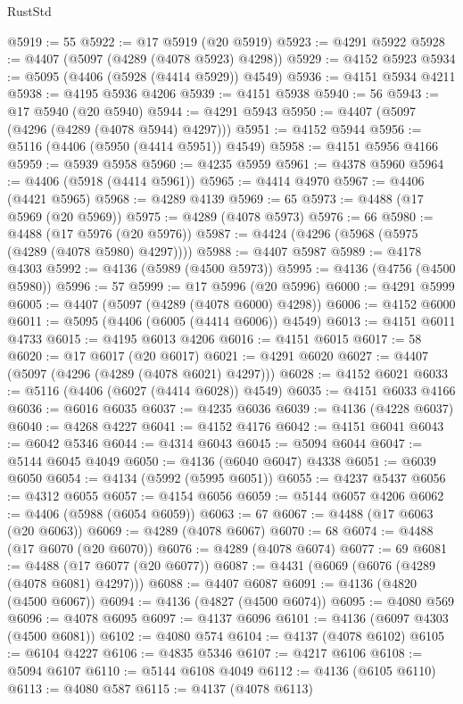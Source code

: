 \begin{lexlean}{RustStd}
\begin{coremodule}
@5919 := 55
@5922 := @17 @5919 (@20 @5919)
@5923 := @4291 @5922
@5928 := @4407 (@5097 (@4289 (@4078 @5923) @4298))
@5929 := @4152 @5923
@5934 := @5095 (@4406 (@5928 (@4414 @5929)) @4549)
@5936 := @4151 @5934 @4211
@5938 := @4195 @5936 @4206
@5939 := @4151 @5938
@5940 := 56
@5943 := @17 @5940 (@20 @5940)
@5944 := @4291 @5943
@5950 := @4407 (@5097 (@4296 (@4289 (@4078 @5944) @4297)))
@5951 := @4152 @5944
@5956 := @5116 (@4406 (@5950 (@4414 @5951)) @4549)
@5958 := @4151 @5956 @4166
@5959 := @5939 @5958
@5960 := @4235 @5959
@5961 := @4378 @5960
@5964 := @4406 (@5918 (@4414 @5961))
@5965 := @4414 @4970
@5967 := @4406 (@4421 @5965)
@5968 := @4289 @4139
@5969 := 65
@5973 := @4488 (@17 @5969 (@20 @5969))
@5975 := @4289 (@4078 @5973)
@5976 := 66
@5980 := @4488 (@17 @5976 (@20 @5976))
@5987 := @4424 (@4296 (@5968 (@5975 (@4289 (@4078 @5980) @4297))))
@5988 := @4407 @5987
@5989 := @4178 @4303
@5992 := @4136 (@5989 (@4500 @5973))
@5995 := @4136 (@4756 (@4500 @5980))
@5996 := 57
@5999 := @17 @5996 (@20 @5996)
@6000 := @4291 @5999
@6005 := @4407 (@5097 (@4289 (@4078 @6000) @4298))
@6006 := @4152 @6000
@6011 := @5095 (@4406 (@6005 (@4414 @6006)) @4549)
@6013 := @4151 @6011 @4733
@6015 := @4195 @6013 @4206
@6016 := @4151 @6015
@6017 := 58
@6020 := @17 @6017 (@20 @6017)
@6021 := @4291 @6020
@6027 := @4407 (@5097 (@4296 (@4289 (@4078 @6021) @4297)))
@6028 := @4152 @6021
@6033 := @5116 (@4406 (@6027 (@4414 @6028)) @4549)
@6035 := @4151 @6033 @4166
@6036 := @6016 @6035
@6037 := @4235 @6036
@6039 := @4136 (@4228 @6037)
@6040 := @4268 @4227
@6041 := @4152 @4176
@6042 := @4151 @6041
@6043 := @6042 @5346
@6044 := @4314 @6043
@6045 := @5094 @6044
@6047 := @5144 @6045 @4049
@6050 := @4136 (@6040 @6047) @4338
@6051 := @6039 @6050
@6054 := @4134 (@5992 (@5995 @6051))
@6055 := @4237 @5437
@6056 := @4312 @6055
@6057 := @4154 @6056
@6059 := @5144 @6057 @4206
@6062 := @4406 (@5988 (@6054 @6059))
@6063 := 67
@6067 := @4488 (@17 @6063 (@20 @6063))
@6069 := @4289 (@4078 @6067)
@6070 := 68
@6074 := @4488 (@17 @6070 (@20 @6070))
@6076 := @4289 (@4078 @6074)
@6077 := 69
@6081 := @4488 (@17 @6077 (@20 @6077))
@6087 := @4431 (@6069 (@6076 (@4289 (@4078 @6081) @4297)))
@6088 := @4407 @6087
@6091 := @4136 (@4820 (@4500 @6067))
@6094 := @4136 (@4827 (@4500 @6074))
@6095 := @4080 @569
@6096 := @4078 @6095
@6097 := @4137 @6096
@6101 := @4136 (@6097 @4303 (@4500 @6081))
@6102 := @4080 @574
@6104 := @4137 (@4078 @6102)
@6105 := @6104 @4227
@6106 := @4835 @5346
@6107 := @4217 @6106
@6108 := @5094 @6107
@6110 := @5144 @6108 @4049
@6112 := @4136 (@6105 @6110)
@6113 := @4080 @587
@6115 := @4137 (@4078 @6113)

\end{coremodule}
\end{lexlean}
